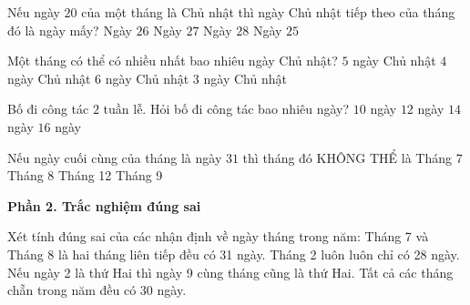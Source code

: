\begin{ex} %
Nếu ngày $20$ của một tháng là Chủ nhật thì ngày Chủ nhật tiếp theo của tháng đó là ngày mấy?
\choice
{Ngày $26$}
{\True Ngày $27$}
{Ngày $28$}
{Ngày $25$}
\end{ex}

\begin{ex} %
Một tháng có thể có nhiều nhất bao nhiêu ngày Chủ nhật?
\choice
{\True $5$ ngày Chủ nhật}
{$4$ ngày Chủ nhật}
{$6$ ngày Chủ nhật}
{$3$ ngày Chủ nhật}
\end{ex}

\begin{ex} %
Bố đi công tác $2$ tuần lễ. Hỏi bố đi công tác bao nhiêu ngày?
\choice
{$10$ ngày}
{$12$ ngày}
{\True $14$ ngày}
{$16$ ngày}
\end{ex}

\begin{ex} %
Nếu ngày cuối cùng của tháng là ngày $31$ thì tháng đó KHÔNG THỂ là
\choice
{Tháng 7}
{Tháng 8}
{Tháng 12}
{\True Tháng 9}
\end{ex}

\textbf{Phần 2. Trắc nghiệm đúng sai}

\begin{ex} %
Xét tính đúng sai của các nhận định về ngày tháng trong năm:
\choiceTF
{\True Tháng 7 và Tháng 8 là hai tháng liên tiếp đều có 31 ngày.}
{Tháng 2 luôn luôn chỉ có 28 ngày.}
{\True Nếu ngày 2 là thứ Hai thì ngày 9 cùng tháng cũng là thứ Hai.}
{Tất cả các tháng chẵn trong năm đều có 30 ngày.}
\end{ex}

